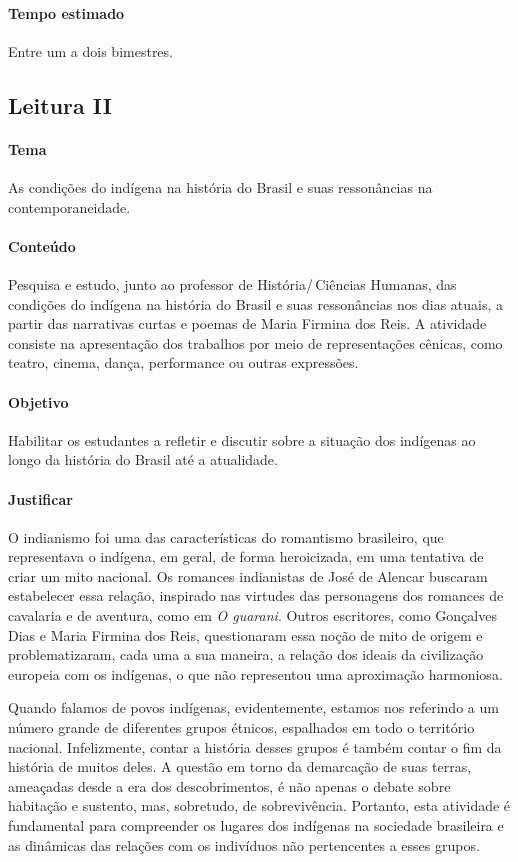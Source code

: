 \documentclass[12pt]{extarticle}
\begin{document}
\paragraph{Tempo estimado} Entre um a dois bimestres.

\subsection{Leitura II}

\paragraph{Tema} As condições do indígena na história do Brasil e suas
  ressonâncias na contemporaneidade.

\paragraph{Conteúdo} Pesquisa e estudo, junto ao professor de 
História/\,Ciências Humanas, das condições do indígena na
história do Brasil e suas ressonâncias nos dias atuais, a partir das
narrativas curtas e poemas de Maria Firmina dos Reis. A atividade
consiste na apresentação dos trabalhos por meio de representações
cênicas, como teatro, cinema, dança, performance ou outras expressões.

\paragraph{Objetivo} Habilitar os estudantes a refletir e discutir sobre a
situação dos indígenas ao longo da história do Brasil até a atualidade.

\paragraph{Justificar} O indianismo foi uma das características do
romantismo brasileiro, que representava o indígena, em geral, de forma
heroicizada, em uma tentativa de criar um mito nacional. Os romances
indianistas de José de Alencar buscaram estabelecer essa relação,
inspirado nas virtudes das personagens dos romances de cavalaria e de
aventura, como em \emph{O guarani}. Outros escritores, como Gonçalves
Dias e Maria Firmina dos Reis, questionaram essa noção de mito de origem
e problematizaram, cada uma a sua maneira, a relação dos ideais da
civilização europeia com os indígenas, o que não representou uma
aproximação harmoniosa.

Quando falamos de povos indígenas, evidentemente, estamos nos referindo
a um número grande de diferentes grupos étnicos, espalhados em todo o
território nacional. Infelizmente, contar a história desses grupos é
também contar o fim da história de muitos deles. A questão em torno da
demarcação de suas terras, ameaçadas desde a era dos descobrimentos, é
não apenas o debate sobre habitação e sustento, mas, sobretudo, de
sobrevivência. Portanto, esta atividade é fundamental para compreender
os lugares dos indígenas na sociedade brasileira e as dinâmicas das
relações com os indivíduos não pertencentes a esses grupos.
\end{document}
